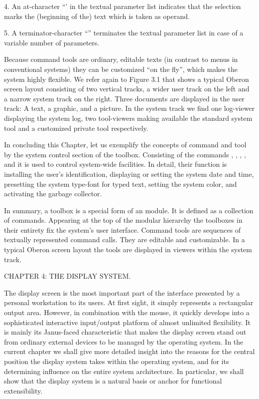 \item{4.} An at-character ``' in the textual parameter list indicates that the selection marks the (beginning of the) text which is taken as operand.

\item{5.} A terminator-character ``\code{\~{}}'' terminates the textual parameter list in case of a variable number of parameters.

\noindent Because command tools are ordinary, editable texts (in contrast to
menus in conventional systems) they can be customized ``on the fly'',
which makes the system highly flexible. We refer again to Figure 3.1
that shows a typical Oberon screen layout consisting of two vertical
tracks, a wider user track on the left and a narrow system track on
the right. Three documents are displayed in the user track: A text, a
graphic, and a picture. In the system track we find one log-viewer
displaying the system log, two tool-viewers making available the
standard system tool and a customized private tool respectively.

In concluding this Chapter, let us exemplify the concepts of command
and tool by the system control section of the 
toolbox. Consisting of the commands , ,
, , and  it is used to control
system-wide facilities. In detail, their function is installing the
user's identification, displaying or setting the system date and time,
presetting the system type-font for typed text, setting the system
color, and activating the garbage collector.

In summary, a toolbox is a special form of an  module. It is
defined as a collection of commands. Appearing at the top of the
modular hierarchy the toolboxes in their entirety fix the system’s
user interface. Command tools are sequences of textually represented
command calls. They are editable and customizable. In a typical Oberon
screen layout the tools are displayed in viewers within the system
track.

\beginchapter CHAPTER 4: THE DISPLAY SYSTEM.

The display screen is the most important part of the interface
presented by a personal workstation to its users. At first sight, it
simply represents a rectangular output area. However, in combination
with the mouse, it quickly develops into a sophisticated interactive
input/output platform of almost unlimited flexibility. It is mainly
its Janus-faced characteristic that makes the display screen stand out
from ordinary external devices to be managed by the operating
system. In the current chapter we shall give more detailed insight
into the reasons for the central position the display system takes
within the operating system, and for its determining influence on the
entire system architecture. In particular, we shall show that the
display system is a natural basis or anchor for functional
extensibility. %

